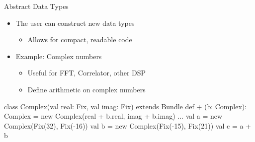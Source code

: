 \documentclass[xcolor=pdflatex,dvipsnames,table]{beamer}
\begin{document}
\begin{frame}[fragile]{Abstract Data Types}
\begin{itemize}
\item The user can construct new data types
\begin{itemize}
\item Allows for compact, readable code
\end{itemize}
\item Example: Complex numbers
\begin{itemize}
\item Useful for FFT, Correlator, other DSP
\item Define arithmetic on complex numbers
\end{itemize}
\end{itemize}

\begin{footnotesize}
\begin{scala}
class Complex(val real: Fix, val imag: Fix) 
    extends Bundle {
  def + (b: Complex): Complex = 
    new Complex(real + b.real, imag + b.imag)
  ...
}
val a = new Complex(Fix(32), Fix(-16))
val b = new Complex(Fix(-15), Fix(21))
val c = a + b
\end{scala}
\end{footnotesize}

\end{frame}
\end{document}
